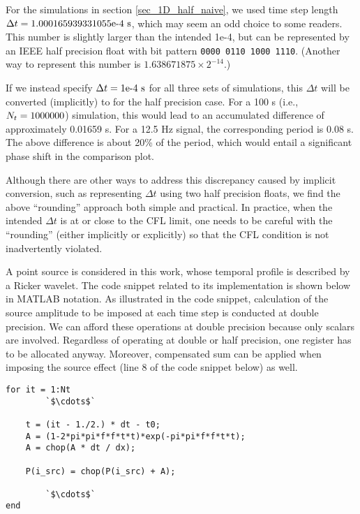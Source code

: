 \documentclass[10pt]{article}
\begin{document}
\begin{remark}\label{rmk_time_step_length}
%
For the simulations in section \ref{sec_1D_half_naive}, we used time step length $\Delta t = \text{\rm1.000165939331055e-4 s}$, which may seem an odd choice to some readers. 
%
This number is slightly larger than the intended {\rm 1e-4}, but can be represented by an IEEE half precision float with bit pattern \texttt{\rm0000 0110 1000 1110}. 
(Another way to represent this number is $1.638671875 \times 2^{-14}$.)


If we instead specify $\Delta t = \text{\rm1e-4 s}$ for all three sets of simulations, this $\Delta t$ will be converted (implicitly) to  for the half precision case.
%
For a {\rm100 s} (i.e., $N_t = \text{\rm 1000000}$) simulation, this would lead to an accumulated difference of approximately {\rm0.01659 s}.
%
For a {\rm12.5 Hz} signal, the corresponding period is {\rm0.08 s}.
%
The above difference is about {\rm20\%} of the period, which would entail a significant phase shift in the comparison plot.


Although there are other ways to address this discrepancy caused by implicit conversion, such as representing $\Delta t$ using two half precision floats, we find the above ``rounding'' approach both simple and practical. 
%
In practice, when the intended $\Delta t$ is at or close to the CFL limit, one needs to be careful with the ``rounding'' (either implicitly or explicitly) so that the CFL condition is not inadvertently violated. 
\end{remark}


\begin{remark}\label{rmk_point_source}
%
A point source is considered in this work, whose temporal profile is described by a Ricker wavelet. 
%
The code snippet related to its implementation is shown below in MATLAB notation.
%
As illustrated in the code snippet, calculation of the source amplitude to be imposed at each time step is conducted at double precision.
%
We can afford these operations at double precision because only scalars are involved.
%
Regardless of operating at double or half precision, one register has to be allocated anyway.
%
Moreover, compensated sum can be applied when imposing the source effect (line 8 of the code snippet below) as well. 
%
\begin{mdframed}[linewidth=0pt]
\vspace{-1em}
\begin{minipage}{\paperwidth}
\begin{lstlisting}[tabsize=4,basicstyle=\ttfamily\scriptsize\rm]
for it = 1:Nt
		`$\cdots$`

    t = (it - 1./2.) * dt - t0;         
    A = (1-2*pi*pi*f*f*t*t)*exp(-pi*pi*f*f*t*t);
    A = chop(A * dt / dx);

    P(i_src) = chop(P(i_src) + A); 

		`$\cdots$`
end
\end{lstlisting}
\end{minipage}
%
\end{mdframed}
%
\end{remark}
\end{document}
